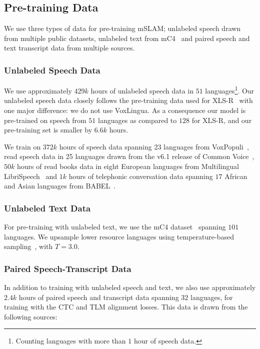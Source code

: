 \documentclass[nohyperref]{article}
\newcommand{\xlsrp}{XLS-R}
\newcommand{\mslam}{mSLAM}
\begin{document}
\subsection{Pre-training Data}
\label{subsec:pretrain-data}

We use three types of data for pre-training \mslam{}; unlabeled speech drawn from multiple public datasets, unlabeled text from mC4~\citep{Xue2021mT5AM} and paired speech and text transcript data from multiple sources.


\subsubsection{Unlabeled Speech Data}
\label{subsubsec:pretrain-data-speech}
We use approximately $429k$ hours of unlabeled speech data in $51$ languages\footnote{Counting languages with more than $1$ hour of speech data.}. Our unlabeled speech data closely follows the pre-training data used for \xlsrp~\citep{babu2021xls} with one major difference: we do not use VoxLingua. As a consequence our model is pre-trained on speech from $51$ languages as compared to $128$ for \xlsrp, and our pre-training set is smaller by $6.6k$ hours.

We train on $372k$ hours of speech data spanning 23 languages from VoxPopuli~\citep{wang2021voxpopuli}, read speech data in 25 languages drawn from the v6.1 release of Common Voice~\citep{ardila2019common}, $50k$ hours of read books data in eight European languages from Multilingual LibriSpeech~\citep{pratap2020mls} and $1k$ hours of telephonic conversation data spanning $17$ African and Asian languages from BABEL~\citep{Gales2014SpeechRA}.

\subsubsection{Unlabeled Text Data}
\label{subsubsec:pretrain-data-text}
For pre-training with unlabeled text, we use the mC4 dataset~\citep{xue-etal-2021-mt5} spanning $101$ languages. We upsample lower resource languages using temperature-based sampling~\citep{arivazhagan2019massively}, with $T=3.0$.

\subsubsection{Paired Speech-Transcript Data}
\label{subsubsec:pretrain-data-paired}
In addition to training with unlabeled speech and text, we also use approximately $2.4k$ hours of paired speech and transcript data spanning $32$ languages, for training with the CTC and TLM alignment losses. This data is drawn from the following sources:
\end{document}
